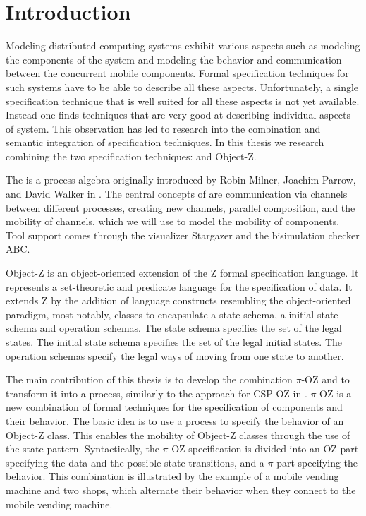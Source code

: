 \chapter{Introduction}
\pagestyle{scrheadings}	
\setcounter{page}{0}
\label{chp_introduction}
Modeling distributed computing systems exhibit various aspects such as modeling the components of the system and modeling the behavior and communication between the concurrent mobile components. Formal specification techniques for such systems have to be able to describe all these aspects. Unfortunately, a single specification technique that is well suited for all these aspects is not yet available. Instead one finds techniques that are very good at describing individual aspects of system. This observation has led to research into the combination and semantic integration of specification techniques. In this thesis we research combining the two specification techniques:
\picalc{} and Object-Z.

The \picalc{} is a process algebra originally introduced by Robin Milner, Joachim Parrow, and David Walker in \cite{milner1992calculus}. The central concepts of \picalc{} are communication via channels between different processes, creating new channels, parallel composition, and the mobility of channels, which we will use to model the mobility of components. Tool support comes through the \picalc{} visualizer Stargazer and the bisimulation checker ABC.

Object-Z \cite{smith2000the} is an object-oriented extension of the Z formal specification language. It represents a set-theoretic and predicate language for the specification of data. It extends Z by the addition of language constructs resembling the object-oriented paradigm, most notably, classes to encapsulate a state schema, a initial state schema and operation schemas. The state schema specifies the set of the legal states. The initial state schema specifies the set of the legal initial states. The operation schemas specify the legal ways of moving from one state to another.


The main contribution of this thesis is to develop the combination $\pi$-OZ and to transform it into a \picalc{} process, similarly to the approach for CSP-OZ in \cite{olderog}. $\pi$-OZ is a new combination of formal techniques for the specification of components and their behavior. The basic idea is to use a \picalc{} process to specify the behavior of an Object-Z class. This enables the mobility of Object-Z classes through the use of the state pattern. Syntactically, the $\pi$-OZ specification is divided into an OZ part specifying the data and the possible state transitions, and a $\pi$ part specifying the behavior.  This combination is illustrated by the example of a mobile vending machine and two shops, which alternate their behavior when they connect to the mobile vending machine.

